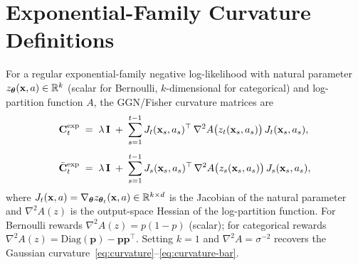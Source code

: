 \section{Exponential-Family Curvature Definitions}\label{app:expfam}

For a regular exponential-family negative log-likelihood with natural parameter
$z_{\boldsymbol{\theta}}(\mathbf{x},a)\in\mathbb{R}^{k}$ (scalar for Bernoulli, $k$-dimensional for
categorical) and log-partition function $A$, the GGN/Fisher curvature matrices are
\begin{align}
  \mathbf{C}_t^{\mathrm{exp}}
  &\;=\;
  \lambda\,\mathbf{I}
  \;+\;
  \sum_{s=1}^{t-1}
    J_t(\mathbf{x}_s,a_s)^\top\,\nabla^2 A\bigl(z_t(\mathbf{x}_s,a_s)\bigr)\,
    J_t(\mathbf{x}_s,a_s),
  \label{eq:curvature-exp}\\[4pt]
  \bar{\mathbf{C}}_t^{\mathrm{exp}}
  &\;=\;
  \lambda\,\mathbf{I}
  \;+\;
  \sum_{s=1}^{t-1}
    J_s(\mathbf{x}_s,a_s)^\top\,\nabla^2 A\bigl(z_s(\mathbf{x}_s,a_s)\bigr)\,
    J_s(\mathbf{x}_s,a_s),
  \label{eq:curvature-bar-exp}
\end{align}
where $J_t(\mathbf{x},a)=\nabla_{\boldsymbol{\theta}}z_{\boldsymbol{\theta}_t}(\mathbf{x},a)\in\mathbb{R}^{k\times d}$
is the Jacobian of the natural parameter and
$\nabla^2 A(z)$ is the output-space Hessian of the log-partition
function.
For Bernoulli rewards $\nabla^2 A(z)=p(1{-}p)$ (scalar);
for categorical rewards $\nabla^2 A(z)=\mathrm{Diag}(\mathbf{p})
-\mathbf{p}\mathbf{p}^\top$.
Setting $k=1$ and $\nabla^2 A=\sigma^{-2}$ recovers the
Gaussian curvature~\eqref{eq:curvature}--\eqref{eq:curvature-bar}.
